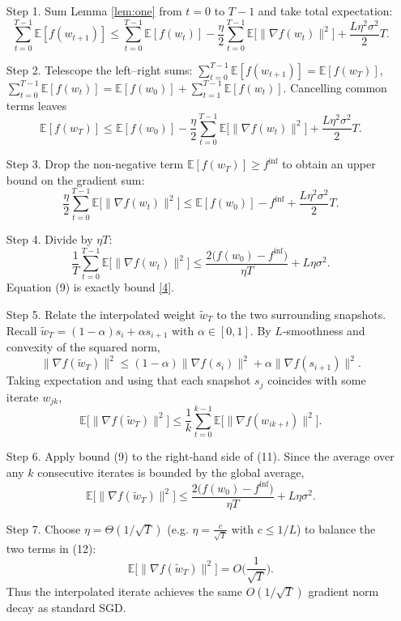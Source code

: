 \documentclass{article}
\begin{document}
\begin{enumerate}
\item[Step 1.] Sum Lemma \ref{lem:one} from $t=0$ to $T-1$ and take total expectation:
\[
\sum_{t=0}^{T-1}\mathbb{E}[f(w_{t+1})]
\le
\sum_{t=0}^{T-1}\mathbb{E}[f(w_t)]
-\frac{\eta}{2}\sum_{t=0}^{T-1}\mathbb{E}\!\big[\|\nabla f(w_t)\|^2\big]
+\frac{L\eta^2\sigma^2}{2}T .
\tag{6}
\]

\item[Step 2.] Telescope the left–right sums: $\sum_{t=0}^{T-1}\mathbb{E}[f(w_{t+1})]=\mathbb{E}[f(w_T)]$, $\sum_{t=0}^{T-1}\mathbb{E}[f(w_t)]=\mathbb{E}[f(w_0)]+\sum_{t=1}^{T-1}\mathbb{E}[f(w_t)]$. Cancelling common terms leaves
\[
\mathbb{E}[f(w_T)]\le \mathbb{E}[f(w_0)]
-\frac{\eta}{2}\sum_{t=0}^{T-1}\mathbb{E}\!\big[\|\nabla f(w_t)\|^2\big]
+\frac{L\eta^2\sigma^2}{2}T .
\tag{7}
\]

\item[Step 3.] Drop the non‑negative term $\mathbb{E}[f(w_T)]\ge f^{\inf}$ to obtain an upper bound on the gradient sum:
\[
\frac{\eta}{2}\sum_{t=0}^{T-1}\mathbb{E}\!\big[\|\nabla f(w_t)\|^2\big]
\le
\mathbb{E}[f(w_0)]-f^{\inf}
+\frac{L\eta^2\sigma^2}{2}T .
\tag{8}
\]

\item[Step 4.] Divide by $\eta T$:
\[
\frac{1}{T}\sum_{t=0}^{T-1}\mathbb{E}\!\big[\|\nabla f(w_t)\|^2\big]
\le
\frac{2\big(f(w_0)-f^{\inf}\big)}{\eta T}
+L\eta\sigma^2 .
\tag{9}
\]
Equation (9) is exactly bound \eqref{4}.

\item[Step 5.] Relate the interpolated weight $\tilde w_T$ to the two surrounding snapshots.
Recall $\tilde w_T=(1-\alpha)s_i+\alpha s_{i+1}$ with $\alpha\in[0,1]$.
By $L$‑smoothness and convexity of the squared norm,
\[
\|\nabla f(\tilde w_T)\|^2
\le (1-\alpha)\|\nabla f(s_i)\|^2+\alpha\|\nabla f(s_{i+1})\|^2 .
\tag{10}
\]
Taking expectation and using that each snapshot $s_j$ coincides with some iterate $w_{jk}$,
\[
\mathbb{E}\!\big[\|\nabla f(\tilde w_T)\|^2\big]
\le\frac{1}{k}\sum_{t=0}^{k-1}\mathbb{E}\!\big[\|\nabla f(w_{i k+t})\|^2\big] .
\tag{11}
\]

\item[Step 6.] Apply bound (9) to the right‑hand side of (11). Since the average over any $k$ consecutive iterates is bounded by the global average,
\[
\mathbb{E}\!\big[\|\nabla f(\tilde w_T)\|^2\big]
\le
\frac{2\big(f(w_0)-f^{\inf}\big)}{\eta T}
+L\eta\sigma^2 .
\tag{12}
\]

\item[Step 7.] Choose $\eta=\Theta(1/\sqrt{T})$ (e.g. $\eta = \frac{c}{\sqrt{T}}$ with $c\le 1/L$) to balance the two terms in (12):
\[
\mathbb{E}\!\big[\|\nabla f(\tilde w_T)\|^2\big]
= O\!\Big(\frac{1}{\sqrt{T}}\Big) .
\tag{13}
\]
Thus the interpolated iterate achieves the same $O(1/\sqrt{T})$ gradient norm decay as standard SGD.
\end{enumerate}
\end{document}
